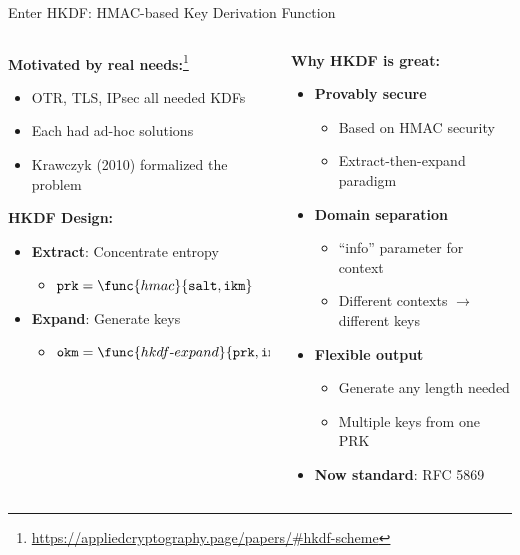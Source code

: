 \documentclass[aspectratio=169, lualatex, handout]{beamer}
\begin{document}
\begin{frame}{Enter HKDF: HMAC-based Key Derivation Function}
	\begin{columns}[c]
		\begin{column}{0.5\textwidth}
			\textbf{Motivated by real needs:}\footnote{\url{https://appliedcryptography.page/papers/\#hkdf-scheme}}
			\begin{itemize}
				\item OTR, TLS, IPsec all needed KDFs
				\item Each had ad-hoc solutions
				\item Krawczyk (2010) formalized the problem
			\end{itemize}
			\textbf{HKDF Design:}
			\begin{itemize}
				\item \textbf{Extract}: Concentrate entropy
				      \begin{itemize}
					      \item $\texttt{prk} = \func{hmac}{\texttt{salt}, \texttt{ikm}}$
				      \end{itemize}
				\item \textbf{Expand}: Generate keys
				      \begin{itemize}
					      \item $\texttt{okm} = \func{hkdf\text{-}expand}{\texttt{prk}, \texttt{info}, \texttt{len}}$
				      \end{itemize}
			\end{itemize}
		\end{column}
		\begin{column}{0.5\textwidth}
			\textbf{Why HKDF is great:}
			\begin{itemize}
				\item \textbf{Provably secure}
				      \begin{itemize}
					      \item Based on HMAC security
					      \item Extract-then-expand paradigm
				      \end{itemize}
				\item \textbf{Domain separation}
				      \begin{itemize}
					      \item ``info'' parameter for context
					      \item Different contexts $\rightarrow$ different keys
				      \end{itemize}
				\item \textbf{Flexible output}
				      \begin{itemize}
					      \item Generate any length needed
					      \item Multiple keys from one PRK
				      \end{itemize}
				\item \textbf{Now standard}: RFC 5869
			\end{itemize}
		\end{column}
	\end{columns}
\end{frame}
\end{document}
